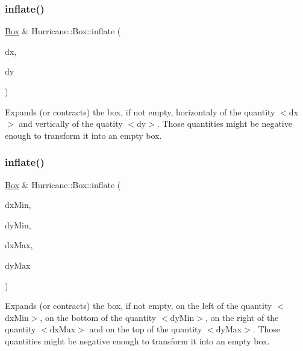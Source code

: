 \subsubsection{\texorpdfstring{inflate()}{inflate()}\hspace{0.1cm}{\footnotesize\ttfamily [2/3]}}
{\footnotesize\ttfamily \hyperlink{classHurricane_1_1Box}{Box} \& Hurricane\+::\+Box\+::inflate (\begin{DoxyParamCaption}\item[{const \hyperlink{group__DbUGroup_ga4fbfa3e8c89347af76c9628ea06c4146}{Db\+U\+::\+Unit} \&}]{dx,  }\item[{const \hyperlink{group__DbUGroup_ga4fbfa3e8c89347af76c9628ea06c4146}{Db\+U\+::\+Unit} \&}]{dy }\end{DoxyParamCaption})}

Expands (or contracts) the box, if not empty, horizontaly of the quantity {\ttfamily $<$dx$>$} and vertically of the quatity {\ttfamily $<$dy$>$}. Those quantities might be negative enough to transform it into an empty box. \mbox{\label{classHurricane_1_1Box_afd1baf9f272878a87c2525f0fa2eab71}} 
\subsubsection{\texorpdfstring{inflate()}{inflate()}\hspace{0.1cm}{\footnotesize\ttfamily [3/3]}}
{\footnotesize\ttfamily \hyperlink{classHurricane_1_1Box}{Box} \& Hurricane\+::\+Box\+::inflate (\begin{DoxyParamCaption}\item[{const \hyperlink{group__DbUGroup_ga4fbfa3e8c89347af76c9628ea06c4146}{Db\+U\+::\+Unit} \&}]{dx\+Min,  }\item[{const \hyperlink{group__DbUGroup_ga4fbfa3e8c89347af76c9628ea06c4146}{Db\+U\+::\+Unit} \&}]{dy\+Min,  }\item[{const \hyperlink{group__DbUGroup_ga4fbfa3e8c89347af76c9628ea06c4146}{Db\+U\+::\+Unit} \&}]{dx\+Max,  }\item[{const \hyperlink{group__DbUGroup_ga4fbfa3e8c89347af76c9628ea06c4146}{Db\+U\+::\+Unit} \&}]{dy\+Max }\end{DoxyParamCaption})}

Expands (or contracts) the box, if not empty, on the left of the quantity {\ttfamily $<$dx\+Min$>$}, on the bottom of the quantity {\ttfamily $<$dy\+Min$>$}, on the right of the quantity {\ttfamily $<$dx\+Max$>$} and on the top of the quantity {\ttfamily $<$dy\+Max$>$}. Those quantities might be negative enough to transform it into an empty box. \mbox{\label{classHurricane_1_1Box_ab77fe56f9350f06cc872bbb4f83835da}} 
